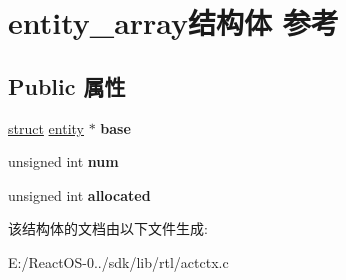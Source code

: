 \hypertarget{structentity__array}{}\section{entity\+\_\+array结构体 参考}
\label{structentity__array}
\subsection*{Public 属性}
\begin{DoxyCompactItemize}
\item 
\mbox{\label{structentity__array_acd01f88f4684c8fce2494ab14b85a8a4}} 
\hyperlink{interfacestruct}{struct} \hyperlink{structentity}{entity} $\ast$ {\bfseries base}
\item 
\mbox{\label{structentity__array_a9edcce351420d5fb4445f71c241ffd7e}} 
unsigned int {\bfseries num}
\item 
\mbox{\label{structentity__array_a7b75d31c847eddf0bc5ada718825e8fb}} 
unsigned int {\bfseries allocated}
\end{DoxyCompactItemize}


该结构体的文档由以下文件生成\+:\begin{DoxyCompactItemize}
\item 
E\+:/\+React\+O\+S-\/0../sdk/lib/rtl/actctx.\+c\end{DoxyCompactItemize}
